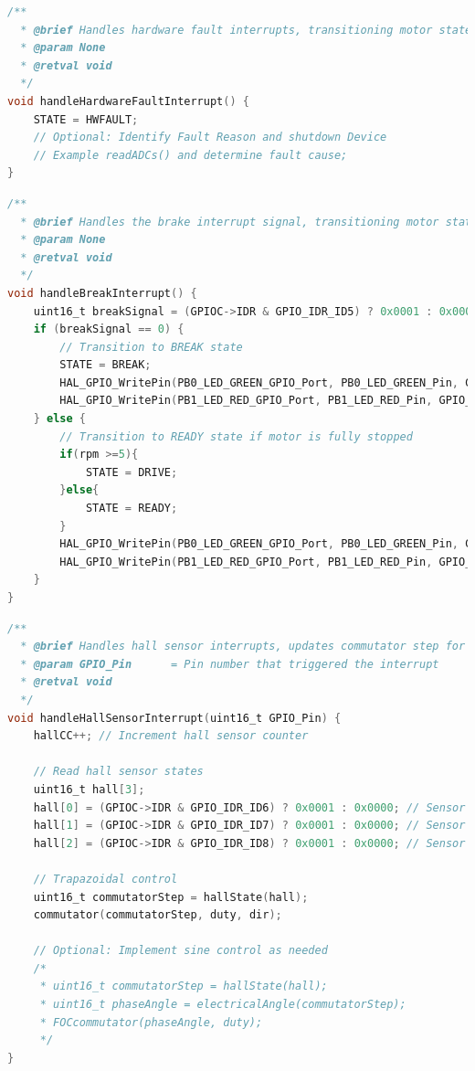 \documentclass[paper=a4,11pt]{scrreprt}
\begin{document}
\begin{lstlisting}[language=C, caption=\textbf{void handleHardwareFaultInterrupt()},label={hwint}, mathescape=true, breaklines=true]
/**
  * @brief Handles hardware fault interrupts, transitioning motor state to HWFAULT
  * @param None
  * @retval void
  */
void handleHardwareFaultInterrupt() {
	STATE = HWFAULT;
    // Optional: Identify Fault Reason and shutdown Device
    // Example readADCs() and determine fault cause;
}
\end{lstlisting}
\newpage
\begin{lstlisting}[language=C, caption=\textbf{void handleBreakInterrupt()},label={brint}, mathescape=true, breaklines=true]
/**
  * @brief Handles the brake interrupt signal, transitioning motor state between BREAK and READY
  * @param None
  * @retval void
  */
void handleBreakInterrupt() {
    uint16_t breakSignal = (GPIOC->IDR & GPIO_IDR_ID5) ? 0x0001 : 0x0000;
    if (breakSignal == 0) {
        // Transition to BREAK state
        STATE = BREAK;
        HAL_GPIO_WritePin(PB0_LED_GREEN_GPIO_Port, PB0_LED_GREEN_Pin, GPIO_PIN_RESET);
        HAL_GPIO_WritePin(PB1_LED_RED_GPIO_Port, PB1_LED_RED_Pin, GPIO_PIN_SET);
    } else {
        // Transition to READY state if motor is fully stopped
    	if(rpm >=5){
    		STATE = DRIVE;
    	}else{
    		STATE = READY;
    	}
        HAL_GPIO_WritePin(PB0_LED_GREEN_GPIO_Port, PB0_LED_GREEN_Pin, GPIO_PIN_SET);
        HAL_GPIO_WritePin(PB1_LED_RED_GPIO_Port, PB1_LED_RED_Pin, GPIO_PIN_RESET);
    }
}
\end{lstlisting}
\newpage
\begin{lstlisting}[language=C, caption=\textbf{void handleHallSensorInterrupt(uint16\_t GPIO\_Pin)},label={senint}, mathescape=true, breaklines=true]
/**
  * @brief Handles hall sensor interrupts, updates commutator step for motor control
  * @param GPIO_Pin      = Pin number that triggered the interrupt
  * @retval void
  */
void handleHallSensorInterrupt(uint16_t GPIO_Pin) {
    hallCC++; // Increment hall sensor counter

    // Read hall sensor states
    uint16_t hall[3];
    hall[0] = (GPIOC->IDR & GPIO_IDR_ID6) ? 0x0001 : 0x0000; // Sensor U
    hall[1] = (GPIOC->IDR & GPIO_IDR_ID7) ? 0x0001 : 0x0000; // Sensor V
    hall[2] = (GPIOC->IDR & GPIO_IDR_ID8) ? 0x0001 : 0x0000; // Sensor W

    // Trapazoidal control
    uint16_t commutatorStep = hallState(hall);
    commutator(commutatorStep, duty, dir);

    // Optional: Implement sine control as needed
    /*
     * uint16_t commutatorStep = hallState(hall);
     * uint16_t phaseAngle = electricalAngle(commutatorStep);
     * FOCcommutator(phaseAngle, duty);
     */
}

\end{lstlisting}
\end{document}
